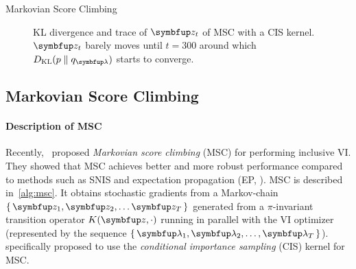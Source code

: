\vspace{-0.1in}
%
  \begin{minipage}[l]{0.45\linewidth}
    \small
    \centering
    \begin{algorithm2e}[H]
      \DontPrintSemicolon
      \SetAlgoLined
      \caption{Markovian Score Climbing}\label{alg:msc}
    \end{algorithm2e}
    \vspace{-0.1in}
  \end{minipage}
  \qquad
  \begin{minipage}[r]{0.5\linewidth}
    \vspace{-0.1in}
    \begin{figure}[H]
      \centering
      
      \caption{KL divergence and trace of \(\vz_t\) of MSC with a CIS kernel.
        \(\vz_t\) barely moves until \(t=300\) around which \(\DKL{p}{q_{\vlambda}}\) starts to converge.}\label{fig:motivating}
    \end{figure}
    \vspace{-0.1in}
  \end{minipage}
%
\subsection{Markovian Score Climbing}\label{section:msc}
%
\paragraph{Description of MSC}
Recently,~\citet{NEURIPS2020_b2070693} proposed \textit{Markovian score climbing} (MSC) for performing inclusive VI.
They showed that MSC achieves better and more robust performance compared to methods such as SNIS and expectation propagation (EP, \citealt{10.5555/2074022.2074067}).
MSC is described in~\cref{alg:msc}.
It obtains stochastic gradients from a Markov-chain \(\{\,\vz_1, \vz_2, \ldots \vz_T\,\}\) generated from a \(\pi\)-invariant transition operator \(K(\vz, \cdot)\) running in parallel with the VI optimizer (represented by the sequence \(\{\,\vlambda_1, \vlambda_2, \ldots, \vlambda_T\,\}\)).
\citeauthor{NEURIPS2020_b2070693} specifically proposed to use the \textit{conditional importance sampling} (CIS) kernel for MSC.

